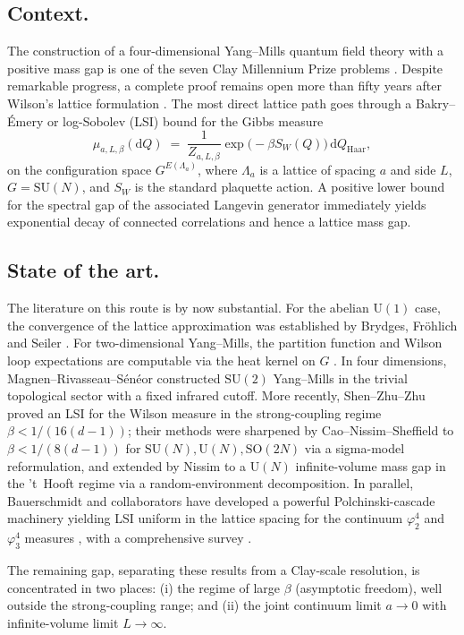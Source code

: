 \documentclass[11pt,reqno]{amsart}
\theoremstyle{plain}
\theoremstyle{definition}
\theoremstyle{remark}
\newcommand{\dd}{\mathrm{d}}
\newcommand{\Lat}{\Lambda}
\newcommand{\SUN}{\mathrm{SU}(N)}
\begin{document}
\subsection{Context.}
The construction of a four-dimensional Yang--Mills quantum field theory with a positive mass gap is one of the seven Clay Millennium Prize problems \cite{JaffeWitten}. Despite remarkable progress, a complete proof remains open more than fifty years after Wilson's lattice formulation \cite{Wilson1974}. The most direct lattice path goes through a Bakry--\'Emery or log-Sobolev (LSI) bound for the Gibbs measure
\[
  \mu_{a, L, \beta}(\dd Q) \;=\; \frac{1}{Z_{a, L, \beta}} \exp\!\bigl( - \beta S_W(Q) \bigr) \, \dd Q_{\mathrm{Haar}},
\]
on the configuration space $G^{E(\Lat_a)}$, where $\Lat_a$ is a lattice of spacing $a$ and side $L$, $G = \SUN$, and $S_W$ is the standard plaquette action. A positive lower bound for the spectral gap of the associated Langevin generator immediately yields exponential decay of connected correlations and hence a lattice mass gap.

\subsection{State of the art.}
The literature on this route is by now substantial. For the abelian $\mathrm{U}(1)$ case, the convergence of the lattice approximation was established by Brydges, Fr\"ohlich and Seiler \cite{BFS80}. For two-dimensional Yang--Mills, the partition function and Wilson loop expectations are computable via the heat kernel on $G$ \cite{Driver1989, Sengupta1992, Levy2003}. In four dimensions, Magnen--Rivasseau--S\'en\'eor \cite{MRS93} constructed $\mathrm{SU}(2)$ Yang--Mills in the trivial topological sector with a fixed infrared cutoff. More recently, Shen--Zhu--Zhu \cite{SZZ22} proved an LSI for the Wilson measure in the strong-coupling regime $\beta < 1/(16(d-1))$; their methods were sharpened by Cao--Nissim--Sheffield \cite{CNS25} to $\beta < 1/(8(d-1))$ for $\mathrm{SU}(N), \mathrm{U}(N), \mathrm{SO}(2N)$ via a sigma-model reformulation, and extended by Nissim \cite{Nissim25} to a $\mathrm{U}(N)$ infinite-volume mass gap in the 't~Hooft regime via a random-environment decomposition. In parallel, Bauerschmidt and collaborators have developed a powerful Polchinski-cascade machinery yielding LSI uniform in the lattice spacing for the continuum $\varphi^4_2$ and $\varphi^4_3$ measures \cite{BD22}, with a comprehensive survey \cite{BBD24}.

The remaining gap, separating these results from a Clay-scale resolution, is concentrated in two places: (i) the regime of large $\beta$ (asymptotic freedom), well outside the strong-coupling range; and (ii) the joint continuum limit $a \to 0$ with infinite-volume limit $L \to \infty$.
\end{document}
